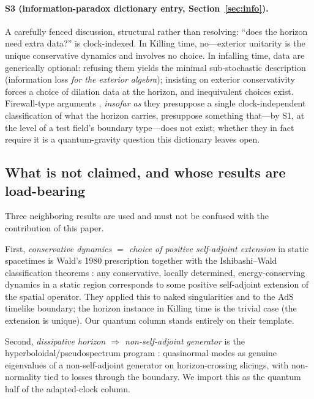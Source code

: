 \documentclass[11pt]{article}
\theoremstyle{definition}
\theoremstyle{remark}
\begin{document}
\paragraph{S3 (information-paradox dictionary entry,
Section~\ref{sec:info}).} A carefully fenced discussion, structural
rather than resolving: ``does the horizon need extra data?'' is
clock-indexed. In Killing time, no---exterior unitarity is the unique
conservative dynamics and involves no choice. In infalling time,
data are generically optional: refusing them yields the minimal
sub-stochastic description (information loss \emph{for the exterior algebra});
insisting on exterior conservativity forces a choice of dilation data
at the horizon, and inequivalent choices exist. Firewall-type
arguments \cite{AMPS2013}, \emph{insofar as} they presuppose a single
clock-independent classification of what the horizon carries,
presuppose something that---by S1, at the level of a test field's
boundary type---does not exist; whether they in fact require it is a
quantum-gravity question this dictionary leaves open.

\subsection{What is not claimed, and whose results are load-bearing}
\label{subsec:notclaimed}

Three neighboring results are used and must not be confused with the
contribution of this paper.

First, \emph{conservative dynamics $=$ choice of positive self-adjoint
extension} in static spacetimes is Wald's 1980 prescription
\cite{Wald1980} together with the Ishibashi--Wald classification
theorems \cite{IshibashiWald2003,IshibashiWald2004}: any conservative,
locally determined, energy-conserving dynamics in a static region
corresponds to some positive self-adjoint extension of the spatial
operator. They applied this to naked singularities and to the AdS
timelike boundary; the horizon instance in Killing time is the trivial
case (the extension is unique). Our quantum column stands entirely on
their template.

Second, \emph{dissipative horizon $\Rightarrow$ non-self-adjoint
generator} is the hyperboloidal/pseudospectrum program
\cite{Warnick2015,GajicWarnick2020,Jaramillo2021}: quasinormal modes as genuine
eigenvalues of a non-self-adjoint generator on horizon-crossing
slicings, with non-normality tied to losses through the boundary. We
import this as the quantum half of the adapted-clock column.
\end{document}
